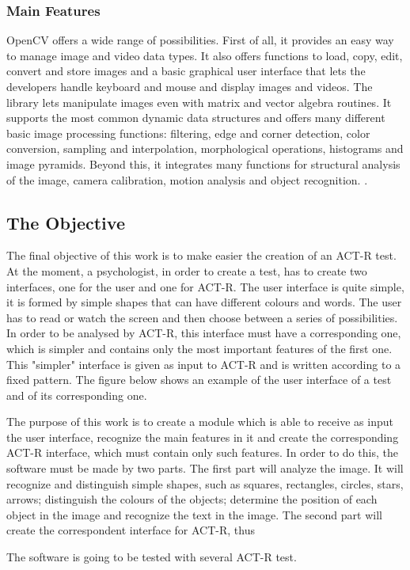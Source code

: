	\subsubsection*{Main Features}
	OpenCV offers a wide range of possibilities. First of all, it provides an easy way to manage image and video data types. It also offers functions to load, copy, edit, convert and store images and a basic graphical user interface that lets the developers handle keyboard and mouse and display images and videos. The library lets manipulate images even with matrix and vector algebra routines. It supports the most common dynamic data structures and offers many different basic image processing functions: filtering, edge and corner detection, color conversion, sampling and interpolation, morphological operations, histograms and image pyramids. Beyond this, it integrates many functions for structural analysis of the image, camera calibration, motion analysis and object recognition. \cite{Agam2006}.
	
\subsection{The Objective}
The final objective of this work is to make easier the creation of an ACT-R test.\newline
At the moment, a psychologist, in order to create a test, has to create two interfaces, one for the user and one for ACT-R. The user interface is quite simple, it is formed by simple shapes that can have different colours and words. The user has to read or watch the screen and then choose between a series of possibilities. In order to be analysed by ACT-R, this interface must have a corresponding one, which is simpler and contains only the most important features of the first one. This "simpler" interface is given as input to ACT-R and is written according to a fixed pattern. The figure below shows an example of the user interface of a test and of its corresponding one.\newline \newline	



The purpose of this work is to create a module which is able to receive as input the user interface, recognize the main features in it and create the corresponding ACT-R interface, which must contain only such features. In order to do this, the software must be made by two parts. The first part will analyze the image. It will recognize and distinguish simple shapes, such as squares, rectangles, circles, stars, arrows; distinguish the colours of the objects; determine the position of each object in the image and recognize the text in the image. The second part will create the correspondent interface for ACT-R, thus \newline \newline	 %
  
The software is going to be tested with several ACT-R test.
